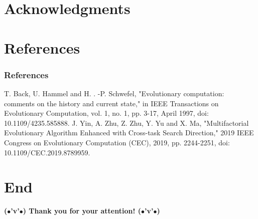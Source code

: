 \documentclass[aspectratio=169]{beamer}
\begin{document}
\section*{Acknowledgments}

\section*{References}
\begin{frame}[allowframebreaks]
	\frametitle{\textbf{References}}
	
	{\scriptsize \begin{thebibliography}{000}
		 T. Back, U. Hammel and H. . -P. Schwefel, "Evolutionary computation: comments on the history and current state," in IEEE Transactions on Evolutionary Computation, vol. 1, no. 1, pp. 3-17, April 1997, doi: 10.1109/4235.585888.
		 J. Yin, A. Zhu, Z. Zhu, Y. Yu and X. Ma, "Multifactorial Evolutionary Algorithm Enhanced with Cross-task Search Direction," 2019 IEEE Congress on Evolutionary Computation (CEC), 2019, pp. 2244-2251, doi: 10.1109/CEC.2019.8789959.
	\end{thebibliography}}
\end{frame}

\section*{End}
{
	\begin{frame}
		\titlepage
		\begin{center}
			\textbf{($\bullet$'v'$\bullet$) Thank you for your attention! ($\bullet$'v'$\bullet$)}
		\end{center}
	\end{frame}
}
\end{document}
